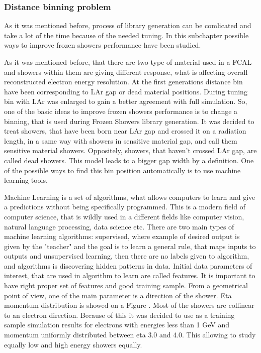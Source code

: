 \subsubsection{Distance binning problem}
As it was mentioned before, process of library generation can be comlicated and take a lot of the time because of the needed tuning. In this subchapter possible ways to improve frozen showers performance have been studied. 
\begin{figure}
\end{figure}
As it was mentioned before, that there are two type of material used in a FCAL and showers within them are giving different response, what is affecting overall reconstructed electron energy resolution.  At the first generations distance bin have been corresponding to LAr gap or dead material positions. During tuning bin with LAr was enlarged to gain a better agreement with full simulation. So, one of the basic ideas to improve frozen showers performance is to change a binning, that is used during Frozen Showers library generation. It was decided to treat showers, that have been born near LAr gap and crossed it on a radiation length, in a same way with showers in sensitive material gap, and call them sensitive material showers. Oppositely, showers, that haven't crossed LAr gap, are called dead showers. This model leads to a bigger gap width by a definition. One of the possible ways to find this bin position automatically is to use machine learning tools. 

Machine Learning is a set of algorithms, what allows computers to learn and give a predictions without being specifically programmed. This is a modern field of computer science, that is wildly used in a different fields like computer vision, natural language processing, data science etc. There are two main types of machine learning algorithms: supervised, where example of desired output is given by the "teacher" and the goal is to learn a general rule, that maps inputs to outputs and unsupervised learning, then there are no labels given to algorithm, and algorithms is discovering hidden patterns in data. Initial data parameters of interest, that are used in algorithm to learn are called features. It is important to have right proper set of features and good training sample. 
From a geometrical point of view, one of the main parameter is a direction of the shower. Eta momentum distribution is showed on a Figure . Most of the showers are collinear to an electron direction. Because of this it was decided to use as a training sample simulation results for electrons with energies less than 1 GeV and momentum uniformly distributed between eta 3.0 and 4.0. This allowing to study equally low and high energy showers equally.

